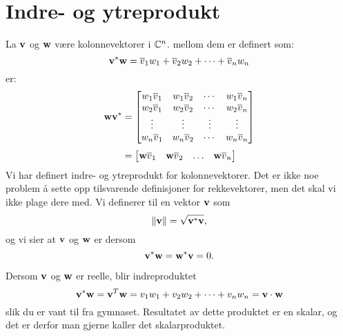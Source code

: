 \section*{Indre- og ytreprodukt}
La $\mathbf{v}$ og $\mathbf{w}$ være kolonnevektorer i $\mathbb{C}^n$. 
 mellom dem er definert som:
\[
\mathbf{v}^* \mathbf{w}= \overline v_1 w_1 + \overline v_2 w_2 + \cdots +\overline v_n w_n
 \] 
  er:
\begin{align*}
 \mathbf{w} \mathbf{v}^*&=
\begin{bmatrix}
w_1 \overline v_1       & w_1 \overline v_2             & \cdots & w_1 \overline v_n \\
w_2 \overline v_1     & w_2 \overline v_2              & \cdots & w_2 \overline v_n   \\
\vdots & \vdots & \vdots  & \vdots \\
w_n \overline v_1     & w_n \overline v_2              & \cdots & w_n \overline v_n   \\
\end{bmatrix}
\\[3pt]&=
\begin{bmatrix}
\mathbf{w}  \overline v_1 & \mathbf{w} \overline v_2  & \hdots & \mathbf{w} \overline v_n 
\end{bmatrix}
 \end{align*}  
 Vi har definert indre- og ytreprodukt for kolonnevektorer. 
 Det er ikke noe problem å sette opp tilsvarende definisjoner for rekkevektorer, 
 men det skal vi ikke plage dere med. 
 Vi definerer  til en vektor $\mathbf{v}$ som 
 \[
 \|\mathbf{v}\|=\sqrt{\mathbf{v}^*\mathbf{v}},
 \]
 og vi sier at $\mathbf{v}$ og $\mathbf{w}$ er  dersom 
\[
 \mathbf{v}^*\mathbf{w}=\mathbf{w}^*\mathbf{v} = 0.
 \] 
 

 
 \begin{merkx}
 Dersom $\mathbf{v}$ og $\mathbf{w}$ er reelle, blir indreproduktet 
\[
\mathbf{v}^* \mathbf{w}=\mathbf{v}^T\mathbf{w}= v_1w_1 + v_2w_2 + \cdots +v_nw_n=\mathbf{v}\cdot  \mathbf{w}
 \] 
 slik du er vant til fra gymnaset. Resultatet av dette produktet er en skalar, og det er derfor man gjerne kaller det skalarproduktet.  
 \end{merkx}
 
